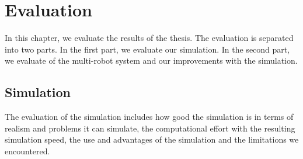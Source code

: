 \chapter{Evaluation}
\label{cha:evaluation}
In this chapter, we evaluate the results of the thesis. The evaluation is separated into two parts. In the first part, we evaluate our simulation. In the second part, we evaluate of the multi-robot system and our improvements with the simulation.

\section{Simulation}
\label{sec:simulation}
The evaluation of the simulation includes how good the simulation is in terms of realism and problems it can simulate, the computational effort with the resulting simulation speed, the use and advantages of the simulation and the limitations we encountered. 

